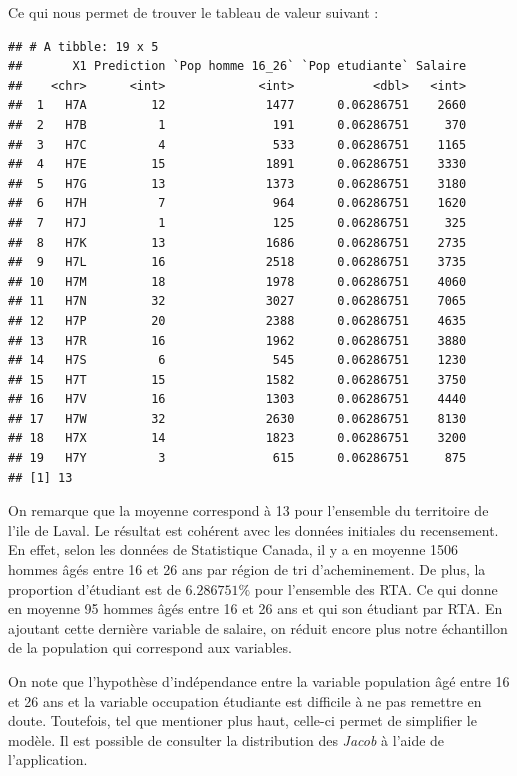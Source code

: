 \documentclass[11pt,french]{report}\usepackage[]{graphicx}\usepackage[]{color}
\makeatletter
\newenvironment{kframe}{%
 \def\at@end@of@kframe{}%
 \ifinner\ifhmode%
  \def\at@end@of@kframe{\end{minipage}}%
  \begin{minipage}{\columnwidth}%
 \fi\fi%
 \def\FrameCommand##1{\hskip\@totalleftmargin \hskip-\fboxsep
 \colorbox{shadecolor}{##1}\hskip-\fboxsep
     \hskip-\linewidth \hskip-\@totalleftmargin \hskip\columnwidth}%
 \MakeFramed {\advance\hsize-\width
   \@totalleftmargin\z@ \linewidth\hsize
   \@setminipage}}%
 {\par\unskip\endMakeFramed%
 \at@end@of@kframe}
\newenvironment{knitrout}{}{} %
\makeatother
\begin{document}
Ce qui nous permet de trouver le tableau de valeur suivant :
\begin{knitrout}
\color{fgcolor}\begin{kframe}
\begin{verbatim}
## # A tibble: 19 x 5
##       X1 Prediction `Pop homme 16_26` `Pop etudiante` Salaire
##    <chr>      <int>             <int>           <dbl>   <int>
##  1   H7A         12              1477      0.06286751    2660
##  2   H7B          1               191      0.06286751     370
##  3   H7C          4               533      0.06286751    1165
##  4   H7E         15              1891      0.06286751    3330
##  5   H7G         13              1373      0.06286751    3180
##  6   H7H          7               964      0.06286751    1620
##  7   H7J          1               125      0.06286751     325
##  8   H7K         13              1686      0.06286751    2735
##  9   H7L         16              2518      0.06286751    3735
## 10   H7M         18              1978      0.06286751    4060
## 11   H7N         32              3027      0.06286751    7065
## 12   H7P         20              2388      0.06286751    4635
## 13   H7R         16              1962      0.06286751    3880
## 14   H7S          6               545      0.06286751    1230
## 15   H7T         15              1582      0.06286751    3750
## 16   H7V         16              1303      0.06286751    4440
## 17   H7W         32              2630      0.06286751    8130
## 18   H7X         14              1823      0.06286751    3200
## 19   H7Y          3               615      0.06286751     875
## [1] 13
\end{verbatim}
\end{kframe}
\end{knitrout}
On remarque que la moyenne correspond à 13 pour l'ensemble du territoire de l'ile de Laval. Le résultat est cohérent avec les données initiales du recensement. En effet,
selon les données de Statistique Canada, il y a en moyenne 1506 hommes âgés entre 16 et 26 ans par région de tri d'acheminement. De plus, la proportion d'étudiant est de $6.286751 \%$ pour l'ensemble des RTA. Ce qui donne en moyenne 95 hommes âgés entre 16 et 26 ans et qui son étudiant par RTA. En ajoutant cette dernière variable de salaire, on réduit encore plus notre échantillon de la population qui correspond aux variables. \newline

On note que l'hypothèse d'indépendance entre la variable population âgé entre 16 et 26 ans et la variable occupation étudiante est difficile à ne pas remettre en doute. Toutefois, tel que mentioner plus haut, celle-ci permet de simplifier le modèle. Il est possible de consulter la distribution des \emph{Jacob} à l'aide de l'application.
\end{document}
